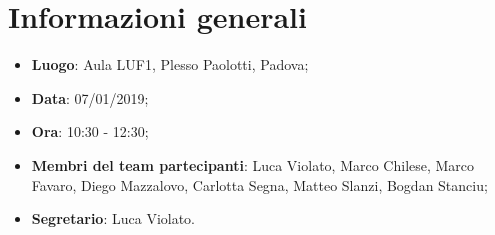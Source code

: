 \section{Informazioni generali}
\begin{itemize}
	\item \textbf{Luogo}: Aula LUF1, Plesso Paolotti, Padova; 
	\item \textbf{Data}: 07/01/2019; 
	\item \textbf{Ora}: 10:30 - 12:30; 
	\item \textbf{Membri del team partecipanti}: Luca Violato, Marco Chilese, Marco Favaro, 
	Diego Mazzalovo, Carlotta Segna, Matteo Slanzi, Bogdan Stanciu; 
	\item \textbf{Segretario}: Luca Violato. 
\end{itemize}






